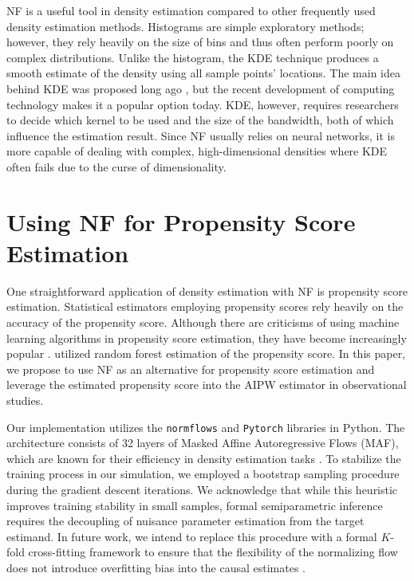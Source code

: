 \documentclass[12pt]{article}
\theoremstyle{definition}
\begin{document}
NF is a useful tool in density estimation compared to other frequently used density estimation methods. Histograms are simple exploratory methods; however, they rely heavily on the size of bins and thus often perform poorly on complex distributions. Unlike the histogram, the KDE technique produces a smooth estimate of the density using all sample points' locations. The main idea behind KDE was proposed long ago \citep{Rosenblatt1956a}, but the recent development of computing technology makes it a popular option today. KDE, however, requires researchers to decide which kernel to be used and the size of the bandwidth, both of which influence the estimation result. Since NF usually relies on neural networks, it is more capable of dealing with complex, high-dimensional densities where KDE often fails due to the curse of dimensionality.

\section{Using NF for Propensity Score Estimation}

One straightforward application of density estimation with NF is propensity score estimation. Statistical estimators employing propensity scores rely heavily on the accuracy of the propensity score. Although there are criticisms of using machine learning algorithms in propensity score estimation, they have become increasingly popular \citep{Goller2020a}. \citet{Lechner2024a} utilized random forest estimation of the propensity score. In this paper, we propose to use NF as an alternative for propensity score estimation and leverage the estimated propensity score into the AIPW estimator in observational studies.

Our implementation utilizes the \texttt{normflows} and \texttt{Pytorch} libraries in Python. The architecture consists of 32 layers of Masked Affine Autoregressive Flows (MAF), which are known for their efficiency in density estimation tasks \citep{Papamakarios2018a}. To stabilize the training process in our simulation, we employed a bootstrap sampling procedure during the gradient descent iterations. We acknowledge that while this heuristic improves training stability in small samples, formal semiparametric inference requires the decoupling of nuisance parameter estimation from the target estimand. In future work, we intend to replace this procedure with a formal $K$-fold cross-fitting framework to ensure that the flexibility of the normalizing flow does not introduce overfitting bias into the causal estimates \citep{chernozhukov2018double}.
\end{document}
